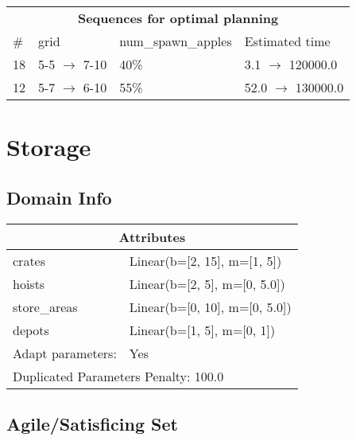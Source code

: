 \documentclass{article}
\begin{document}
                            \begin{center}
                            \begin{tabular}{l|l|l|l}
                            \multicolumn{4}{c}{\bf \large Sequences for optimal planning}\\
                            \# & grid & num\_spawn\_apples & Estimated time\\\midrule
                            18&5-5 $\rightarrow$ 7-10&40\%&3.1 $\rightarrow$ 120000.0\\
12&5-7 $\rightarrow$ 6-10&55\%&52.0 $\rightarrow$ 130000.0
                            \end{tabular}
                            \end{center}
                    \newpage \section{Storage}
                    \subsection*{Domain Info}

                    \begin{center}
                    \begin{tabular}{p{}p{}}
                    \multicolumn{2}{c}{\bf \large Attributes}\\\midrule
                    crates & Linear(b=[2, 15], m=[1, 5])\\
hoists & Linear(b=[2, 5], m=[0, 5.0])\\
store\_areas & Linear(b=[0, 10], m=[0, 5.0])\\
depots & Linear(b=[1, 5], m=[0, 1])
                    
                    \\\midrule
                    Adapt parameters: & Yes
                
                     \\\midrule
                    \multicolumn{2}{l}{Duplicated Parameters Penalty: 100.0}
                    \end{tabular}
                    \end{center}
                
                         \subsection*{Agile/Satisficing Set}
\end{document}
